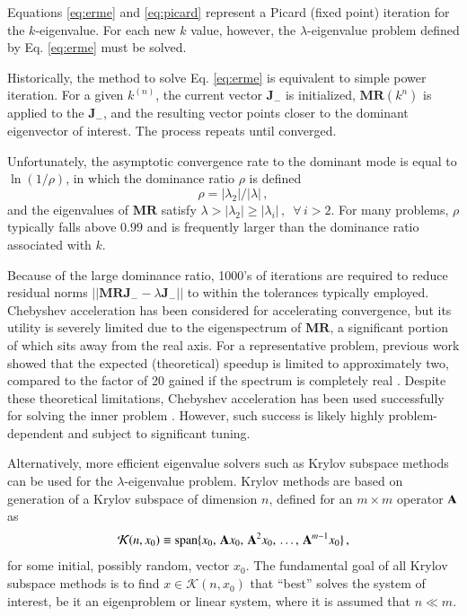 Equations \ref{eq:erme} and \ref{eq:picard} represent
a Picard (fixed point) iteration
for the $k$-eigenvalue.  For each new $k$ value, however, the 
$\lambda$-eigenvalue problem defined by Eq. \ref{eq:erme} must be 
solved.

Historically, the method to solve Eq. \ref{eq:erme} is equivalent to 
simple power iteration.
For a given $k^{(n)}$, the current vector $\mathbf{J}_{-}$ is 
initialized,
$\mathbf{MR}(k^{n})$ is applied to the $\mathbf{J}_{-}$, and the resulting 
vector points closer to the dominant eigenvector of interest.  
The process repeats until converged. 

Unfortunately, the asymptotic convergence rate to the dominant mode is 
equal to $\ln{(1/\rho)}$, in which the dominance ratio $\rho$  is defined
\begin{equation}
 \rho = |\lambda_2| / |\lambda| \, ,
\end{equation}
and the eigenvalues of 
$\mathbf{M}\mathbf{R}$ satisfy 
$\lambda > |\lambda_2| \geq |\lambda_i| \, , \,\,\, \forall \, i > 2$.  
For many problems, $\rho$ typically falls 
above $0.99$ and is frequently larger than the dominance 
ratio associated with $k$.

Because of the large dominance ratio, 1000's of iterations are required 
to reduce residual norms $||\mathbf{MRJ}_- - \lambda \mathbf{J}_-||$ to 
within the tolerances typically employed. 
Chebyshev acceleration 
has been considered for accelerating convergence, but its utility is severely 
limited due to the eigenspectrum of $\mathbf{MR}$, a 
significant portion of which sits away from the real axis.  
For a representative problem, previous work 
showed that the expected (theoretical) speedup is limited to 
approximately two, compared to the factor of 20 gained if the spectrum is
completely real \cite{roberts2012ksi}.
Despite these theoretical limitations, 
Chebyshev acceleration has been used successfully for solving the inner 
problem \cite{zhang2012ehs}.  However, such success is likely highly 
problem-dependent and subject to significant tuning.

Alternatively,
more efficient eigenvalue solvers such as Krylov subspace 
methods can be used for the $\lambda$-eigenvalue problem.  
Krylov methods are based on generation
of a Krylov subspace of dimension $n$, 
defined for an $m \times m$ operator $\mathbf{A}$ as
\begin{equation}
 \mathcal{K}(n,x_0) \equiv \text{span} 
     \{x_0,\, \mathbf{A}x_0,\, \mathbf{A}^2x_0 , \, 
        \ldots , \, \mathbf{A}^{m-1}x_0 \} \, , 
 \label{eq:krylovsubspace}
\end{equation}
for some initial, possibly random, vector $x_0$.  The fundamental 
goal of all Krylov subspace methods is to find  $x \in \mathcal{K}(n,x_0)$  
that ``best'' solves the system of interest, be it an 
eigenproblem or linear system, where it is assumed that $n \ll m$.

